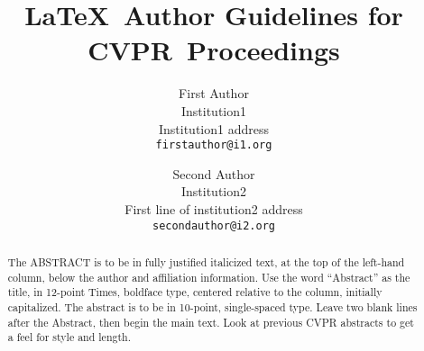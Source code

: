 \documentclass{source/Paper}
\def\confName{CVPR}
\begin{document}
\title{\LaTeX\ Author Guidelines for \confName~Proceedings}

\author{First Author\\
Institution1\\
Institution1 address\\
{\tt\small firstauthor@i1.org}
\and
Second Author\\
Institution2\\
First line of institution2 address\\
{\tt\small secondauthor@i2.org}
}
\maketitle

\begin{abstract}
    The ABSTRACT is to be in fully justified italicized text, at the top of the left-hand column, below the author and affiliation information.
    Use the word ``Abstract'' as the title, in 12-point Times, boldface type, centered relative to the column, initially capitalized.
    The abstract is to be in 10-point, single-spaced type.
    Leave two blank lines after the Abstract, then begin the main text.
    Look at previous CVPR abstracts to get a feel for style and length.
\end{abstract}








\cite{Authors14}

{\small


}
\end{document}
